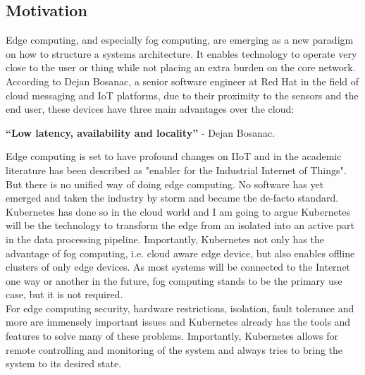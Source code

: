 \subsection{Motivation}
Edge computing, and especially fog computing, are emerging as a new paradigm on how to structure a systems architecture. It enables technology to operate very close to the user or thing while not placing an extra burden on the core network. According to Dejan Bosanac, a senior software engineer at Red Hat in the field of cloud messaging and IoT platforms, due to their proximity to the sensors and the end user, these devices have three main advantages over the cloud: 
\begin{displayquote}
{\textbf{``Low latency, availability and locality''}}\cite{IntroducingDejanBosanac:KubernetesIoTEdgeWorkingGroup} - Dejan Bosanac.
\end{displayquote} 
Edge computing is set to have profound changes on IIoT and in the academic literature has been described as "enabler for the Industrial Internet of Things"\cite{steiner2016fogenablerIIoT}.\\
But there is no unified way of doing edge computing. No software has yet emerged and taken the industry by storm and became the de-facto standard. Kubernetes has done so in the cloud world and I am going to argue Kubernetes will be the technology to transform the edge from an isolated into an active part in the data processing pipeline. Importantly, Kubernetes not only has the advantage of fog computing, i.e. cloud aware edge device, but also enables offline clusters of only edge devices. As most systems will be connected to the Internet one way or another in the future, fog computing stands to be the primary use case, but it is not required.\\
For edge computing security, hardware restrictions, isolation, fault tolerance and more are immensely important issues and Kubernetes already has the tools and features to solve many of these problems. Importantly, Kubernetes allows for remote controlling and monitoring of the system and always tries to bring the system to its desired state.\\

